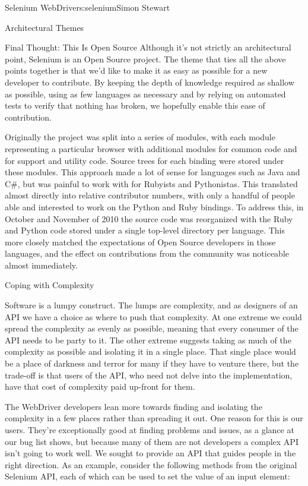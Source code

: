\begin{aosachapter}{Selenium WebDriver}{s:selenium}{Simon Stewart}
\begin{aosasect1}{Architectural Themes}
\begin{aosasect2}{Final Thought: This Is Open Source}
Although it's not strictly an architectural point, Selenium is an Open
Source project. The theme that ties all the above points together is
that we'd like to make it as easy as possible for a new developer to
contribute. By keeping the depth of knowledge required as shallow as
possible, using as few languages as necessary and by relying on
automated tests to verify that nothing has broken, we hopefully enable
this ease of contribution.

Originally the project was split into a series of modules, with each
module representing a particular browser with additional modules for
common code and for support and utility code. Source trees for each
binding were stored under these modules. This approach made a lot of
sense for languages such as Java and C\#, but was painful to work with
for Rubyists and Pythonistas. This translated almost directly into
relative contributor numbers, with only a handful of people able and
interested to work on the Python and Ruby bindings. To address this,
in October and November of 2010 the source code was reorganized with
the Ruby and Python code stored under a single top-level directory per
language. This more closely matched the expectations of Open Source
developers in those languages, and the effect on contributions from
the community was noticeable almost immediately.

\end{aosasect2}

\end{aosasect1}

\begin{aosasect1}{Coping with Complexity}

Software is a lumpy construct. The lumps are complexity, and as
designers of an API we have a choice as where to push that
complexity. At one extreme we could spread the complexity as evenly as
possible, meaning that every consumer of the API needs to be party to
it. The other extreme suggests taking as much of the complexity as
possible and isolating it in a single place. That single place would
be a place of darkness and terror for many if they have to venture
there, but the trade-off is that users of the API, who need not delve
into the implementation, have that cost of complexity paid up-front
for them.

The WebDriver developers lean more towards finding and isolating the
complexity in a few places rather than spreading it out. One reason
for this is our users. They're exceptionally good at finding problems
and issues, as a glance at our bug list shows, but because many of
them are not developers a complex API isn't going to work well. We
sought to provide an API that guides people in the right direction. As
an example, consider the following methods from the original Selenium
API, each of which can be used to set the value of an input element:


\end{aosasect1}
\end{aosachapter}
